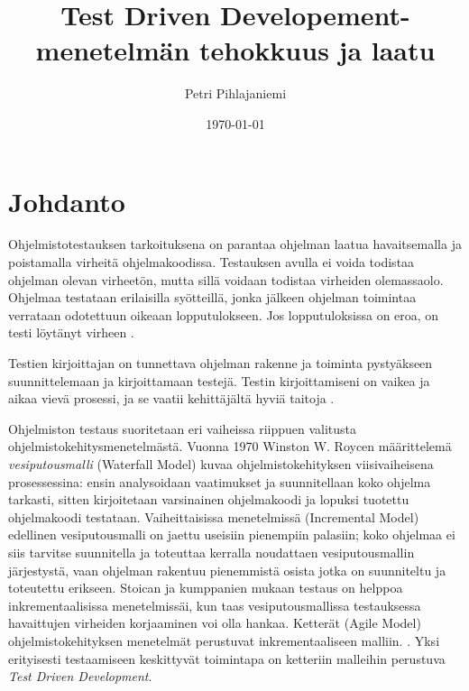 \documentclass[finnish]{tktltiki2}
\title{Test Driven Developement-menetelmän tehokkuus ja laatu}
\author{Petri Pihlajaniemi}
\date{\today}
\theoremstyle{definition}
\theoremstyle{remark}
\begin{document}


\maketitle        %
\makeabstract     %

\tableofcontents  %


\mainmatter       %




\section{Johdanto}


Ohjelmistotestauksen tarkoituksena on parantaa ohjelman laatua havaitsemalla ja poistamalla virheitä ohjelmakoodissa. Testauksen avulla ei voida todistaa ohjelman olevan virheetön, mutta sillä voidaan todistaa virheiden olemassaolo. Ohjelmaa testataan erilaisilla syötteillä, jonka jälkeen ohjelman toimintaa verrataan odotettuun oikeaan lopputulokseen. Jos lopputuloksissa on eroa, on testi löytänyt virheen \cite{Muccini08}.


Testien kirjoittajan on tunnettava ohjelman rakenne ja toiminta pystyäkseen suunnittelemaan ja kirjoittamaan testejä. Testin kirjoittamiseni on vaikea ja aikaa vievä prosessi, ja se vaatii kehittäjältä hyviä taitoja \cite{Whittaker00}.

Ohjelmiston testaus suoritetaan eri vaiheissa riippuen valitusta ohjelmistokehitysmenetelmästä. Vuonna 1970 Winston W. Roycen määrittelemä \emph{vesiputousmalli} (Waterfall Model) kuvaa ohjelmistokehityksen viisivaiheisena prosessessina: ensin analysoidaan vaatimukset ja suunnitellaan koko ohjelma tarkasti, sitten kirjoitetaan varsinainen ohjelmakoodi ja lopuksi tuotettu ohjelmakoodi testataan. Vaiheittaisissa menetelmissä (Incremental Model) edellinen vesiputousmalli on jaettu useisiin pienempiin palasiin; koko ohjelmaa ei siis tarvitse suunnitella ja toteuttaa kerralla noudattaen vesiputousmallin järjestystä, vaan ohjelman rakentuu pienemmistä osista jotka on suunniteltu ja toteutettu erikseen. Stoican ja kumppanien mukaan testaus on helppoa inkrementaalisissa menetelmissäi, kun taas vesiputousmallissa testauksessa havaittujen virheiden korjaaminen voi olla hankaa. Ketterät (Agile Model) ohjelmistokehityksen menetelmät perustuvat inkrementaaliseen malliin. \cite{Stoica13}. Yksi erityisesti testaamiseen keskittyvät toimintapa on ketteriin malleihin perustuva \emph{Test Driven Development}. \cite{Crispin06}
\end{document}
